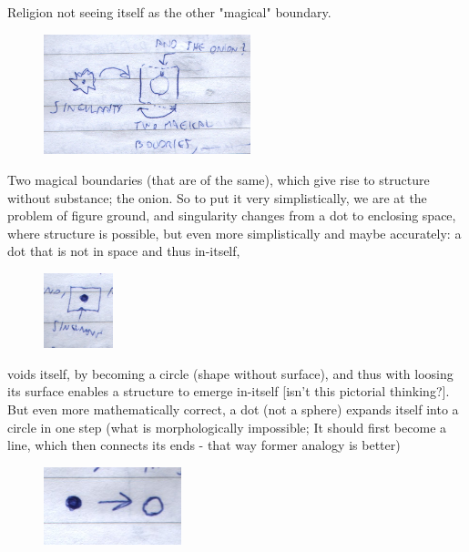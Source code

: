 \documentclass[10pt]{book}
\begin{document}
Religion not seeing itself as the other "magical" boundary. 
\begin{figure}[ht!]
\centering
\includegraphics[width=60mm]{scan03.jpg}
\label{overflow}
\end{figure}
Two magical boundaries (that are of the same), which give rise to structure without substance; the onion.
So to put it very simplistically, we are at the problem of figure ground, and singularity changes from a dot to enclosing space, where structure is possible, but even more simplistically and maybe accurately: a dot that is not in space and thus in-itself, 
\begin{figure}[ht!]
\centering
\includegraphics[width=20mm]{scan04.jpg}
\label{overflow}
\end{figure}
voids itself, by becoming a circle (shape without surface), and thus with loosing its surface enables a structure to emerge in-itself [isn't this pictorial thinking?]. But even more mathematically correct, a dot (not a sphere) expands itself into a circle in one step (what is morphologically impossible; It should first become a line, which then connects its ends - that way former analogy is better)
\begin{figure}[ht!]
\centering
\includegraphics[width=40mm]{scan05.jpg}
\label{overflow}
\end{figure}
\end{document}
